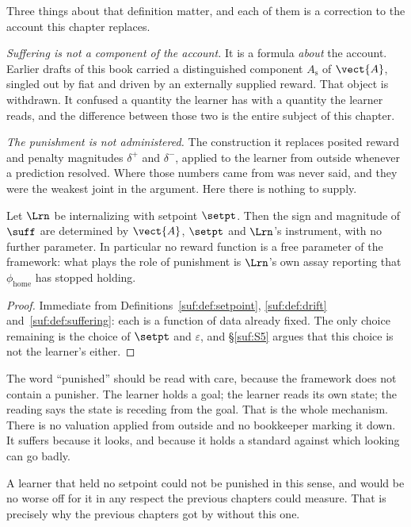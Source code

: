Three things about that definition matter, and each of them is a
correction to the account this chapter replaces.

\emph{Suffering is not a component of the account.}
It is a formula \emph{about} the account.
Earlier drafts of this book carried a distinguished component
$A_{\mathrm{s}}$ of $\vect{A}$, singled out by fiat and driven by an
externally supplied reward.
That object is withdrawn.
It confused a quantity the learner has with a quantity the learner reads,
and the difference between those two is the entire subject of this
chapter.

\emph{The punishment is not administered.}
The construction it replaces posited reward and penalty magnitudes
$\delta^+$ and $\delta^-$, applied to the learner from outside whenever a
prediction resolved.
Where those numbers came from was never said, and they were the weakest
joint in the argument.
Here there is nothing to supply.

\begin{proposition}
\label{suf:prop:derived}
Let $\Lrn$ be internalizing with setpoint $\setpt$.
Then the sign and magnitude of $\suff$ are determined by
$\vect{A}$, $\setpt$ and $\Lrn$'s instrument, with no further parameter.
In particular no reward function is a free parameter of the framework:
what plays the role of punishment is $\Lrn$'s own assay reporting that
$\phi_{\mathrm{home}}$ has stopped holding.
\end{proposition}

\begin{proof}
Immediate from Definitions~\ref{suf:def:setpoint},
\ref{suf:def:drift} and~\ref{suf:def:suffering}: each is a function of
data already fixed.
The only choice remaining is the choice of $\setpt$ and $\varepsilon$,
and \S\ref{suf:S5} argues that this choice is not the learner's either.
\end{proof}

\begin{remark}
\label{suf:rem:sees}
The word ``punished'' should be read with care, because the framework
does not contain a punisher.
The learner holds a goal; the learner reads its own state; the reading
says the state is receding from the goal.
That is the whole mechanism.
There is no valuation applied from outside and no bookkeeper marking it
down.
It suffers because it looks, and because it holds a standard against
which looking can go badly.

A learner that held no setpoint could not be punished in this sense, and
would be no worse off for it in any respect the previous chapters could
measure.
That is precisely why the previous chapters got by without this one.
\end{remark}

